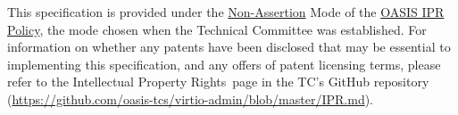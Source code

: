 This specification is provided under the
\href{https://www.oasis-open.org/policies-guidelines/ipr/#Non-Assertion-Mode}{Non-Assertion} Mode of the
\href{https://www.oasis-open.org/policies-guidelines/ipr/}{OASIS IPR Policy}, the
mode chosen when the Technical Committee was established. For information on
whether any patents have been disclosed that may be essential to implementing
this specification, and any offers of patent licensing terms, please refer to
the Intellectual Property Rights page in the TC's GitHub repository
(\url{https://github.com/oasis-tcs/virtio-admin/blob/master/IPR.md}).

